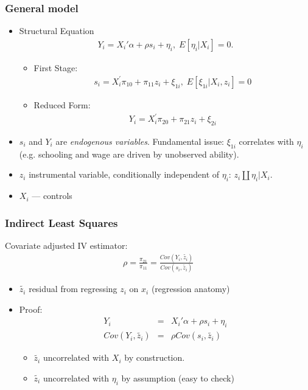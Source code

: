 \documentclass[pdftex]{beamer}
\begin{document}
\begin{frame}
\frametitle{General model}
\begin{itemize}
\item Structural Equation
\begin{eqnarray*}
  Y_{i} = X_{i}' \alpha+ \rho s_{i}+\eta_{i}, \; E[\eta_i|X_i] = 0.
\end{eqnarray*}
    \begin {itemize}
       \item First Stage:
      \begin{eqnarray*}
           s_{i}= X_{i}^{'}\pi_{10}+ \pi_{11}z_{i}+ \xi_{1i}, \; E[\xi_{1i}|X_i, z_i] = 0
      \end{eqnarray*}
    \item Reduced Form:
        \begin{eqnarray*}
           Y_{i}= X_{i}^{'}\pi_{20}+ \pi_{21}z_{i}+ \xi_{2i}
      \end{eqnarray*}
\end {itemize}
\item $s_{i}$ and $Y_{i}$ are \emph{endogenous variables}. 	Fundamental issue: $\xi_{1i}$ correlates with $\eta_i$ (e.g. schooling and wage are driven by unobserved ability).
\item $z_{i}$ instrumental variable, conditionally  independent of $\eta_i$: $z_i\amalg \eta_i|X_i$.
\item $X_{i}$ --- controls

\end{itemize}
\end{frame}




\begin{frame}
\frametitle{Indirect Least Squares}


Covariate adjusted IV estimator:
\begin{eqnarray*}
  \rho=\frac{\pi_{21}}{\pi_{11}}=\frac{Cov\left(Y_{i}, \tilde{z_{i}}\right)}{Cov\left(s_{i},\tilde{ z_{i}}\right)}
\end{eqnarray*}
\begin {itemize}


\item $\tilde{z_{i}}$ residual from regressing $z_{i}$ on $x_{i}$ (regression anatomy)
\item Proof:
\begin{eqnarray*}
  Y_{i} &=& X_{i}' \alpha+ \rho s_{i}+\eta_{i}  \\
  Cov\left(Y_{i}, \tilde{z_{i}}\right)&=& \rho Cov\left(s_{i}, \tilde{z_{i}}\right)
\end{eqnarray*}
      \begin {itemize}
     \item $\tilde{z_{i}}$ uncorrelated with $X_{i}$ by construction.
     \item $\tilde{z_{i}}$ uncorrelated with $\eta_{i}$ by assumption (easy to check)
\end {itemize}
\end {itemize}

\end{frame}
\end{document}
